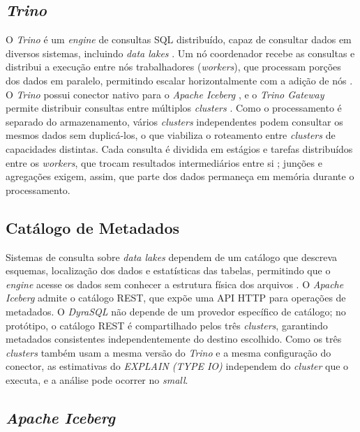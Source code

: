\subsection{\textit{Trino}}

O \textit{Trino} é um \textit{engine} de consultas SQL distribuído, capaz de consultar dados em diversos sistemas, incluindo \textit{data lakes} \cite{trinoconcepts}. Um nó coordenador recebe as consultas e distribui a execução entre nós trabalhadores (\textit{workers}), que processam porções dos dados em paralelo, permitindo escalar horizontalmente com a adição de nós \cite{trinoconcepts}. O \textit{Trino} possui conector nativo para o \textit{Apache Iceberg} \cite{trinoconcepts}, e o \textit{Trino Gateway} permite distribuir consultas entre múltiplos \textit{clusters} \cite{trinogateway}. Como o processamento é separado do armazenamento, vários \textit{clusters} independentes podem consultar os mesmos dados sem duplicá-los, o que viabiliza o roteamento entre \textit{clusters} de capacidades distintas. Cada consulta é dividida em estágios e tarefas distribuídos entre os \textit{workers}, que trocam resultados intermediários entre si \cite{trinoconcepts}; junções e agregações exigem, assim, que parte dos dados permaneça em memória durante o processamento.

\subsection{Catálogo de Metadados}

Sistemas de consulta sobre \textit{data lakes} dependem de um catálogo que descreva esquemas, localização dos dados e estatísticas das tabelas, permitindo que o \textit{engine} acesse os dados sem conhecer a estrutura física dos arquivos \cite{iceberg2024}. O \textit{Apache Iceberg} admite o catálogo REST, que expõe uma API HTTP para operações de metadados. O \textit{DyraSQL} não depende de um provedor específico de catálogo; no protótipo, o catálogo REST é compartilhado pelos três \textit{clusters}, garantindo metadados consistentes independentemente do destino escolhido. Como os três \textit{clusters} também usam a mesma versão do \textit{Trino} e a mesma configuração do conector, as estimativas do \textit{EXPLAIN (TYPE IO)} independem do \textit{cluster} que o executa, e a análise pode ocorrer no \textit{small}.

\subsection{\textit{Apache Iceberg}}
\label{sec:apache-iceberg}

